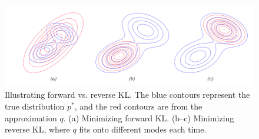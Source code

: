 \begin{figure}[H]
    \centering
    \includegraphics[width=0.9\linewidth]{images/rev_forw_kl.png}
    \caption{Illustrating forward vs. reverse KL. The blue contours represent the true distribution $p^*$, 
    and the red contours are from the approximation $q$. (a) Minimizing forward KL. (b–c) Minimizing reverse KL, 
    where $q$ fits onto different modes each time. }
    \label{fig:reverse_vs_forward_kl}
\end{figure}

